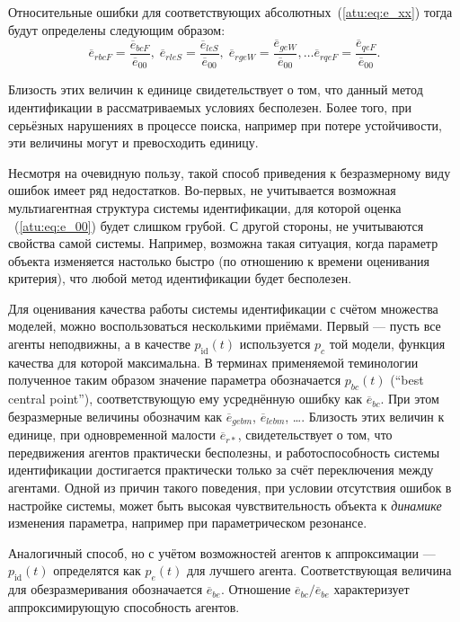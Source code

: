 Относительные ошибки для соответствующих абсолютных~(\ref{atu:eq:e_xx})
тогда будут определены следующим образом:
%
\begin{equation}
  \overline{e}_{rbcF} = \frac{\overline{e}_{bcF}}{\overline{e}_{00}}, \;
  \overline{e}_{rleS} = \frac{\overline{e}_{leS}}{\overline{e}_{00}}, \;
  \overline{e}_{rgeW} = \frac{\overline{e}_{geW}}{\overline{e}_{00}},
  \ldots
  \overline{e}_{rqeF} = \frac{\overline{e}_{qeF}}{\overline{e}_{00}}.
  \label{atu:eq:e_rxx}
\end{equation}

Близость этих величин к единице свидетельствует о том, что
данный метод идентификации в рассматриваемых условиях бесполезен.
Более того, при серьёзных нарушениях в процессе поиска,
например при потере устойчивости, эти величины могут и превосходить единицу.

Несмотря на очевидную пользу, такой способ приведения к безразмерному виду ошибок
имеет ряд недостатков. Во-первых,
не учитывается возможная мультиагентная структура системы идентификации,
для которой оценка ~(\ref{atu:eq:e_00}) будет слишком грубой.
С другой стороны,
не учитываются свойства
самой системы. Например, возможна такая ситуация, когда параметр
объекта изменяется настолько быстро (по отношению к времени оценивания критерия),
что любой метод идентификации будет бесполезен.

Для оценивания качества работы системы идентификации с счётом
множества моделей, можно воспользоваться несколькими приёмами.
Первый --- пусть все агенты неподвижны, а в качестве $p_\mathrm{id}(t)$
используется $p_c$ той модели, функция качества для которой
максимальна. В терминах применяемой теминологии полученное таким образом значение
параметра обозначается $p_{bc}(t)$ (``best central point''),
соответствующую ему усреднённую ошибку как $\overline{e}_{bc}$.
При этом безразмерные величины обозначим как
$\overline{e}_{gebm}$, $\overline{e}_{lebm}$,  \ldots.
Близость этих величин к единице, при одновременной малости
$\overline{e}_{r*}$, свидетельствует о том, что передвижения
агентов практически бесполезны, и работоспособность системы идентификации достигается
практически только за счёт переключения между агентами.
Одной из причин такого поведения, при условии отсутствия ошибок
в настройке системы, может быть высокая чувствительность
объекта к \textit{динамике} изменения параметра, например
при параметрическом резонансе.

Аналогичный способ, но с учётом возможностей агентов
к аппроксимации --- $p_\mathrm{id}(t)$ определятся
как $p_e(t)$ для лучшего агента.
Соответствующая величина для обезразмеривания обозначается
$\overline{e}_{be}$.
Отношение $\overline{e}_{bc} / \overline{e}_{be}$
характеризует аппроксимирующую способность агентов.

